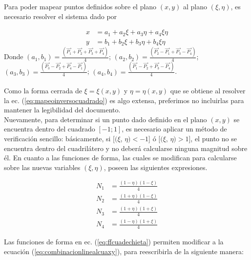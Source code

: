 Para poder mapear puntos definidos sobre el plano $(x,y)$ al plano $(\xi, \eta)$, es necesario resolver el sistema dado por 

\begin{equation}
  \label{eq:mapeoinversocuadrado}
  \begin{split}
    x & = a_1 + a_2\xi + a_3\eta + a_4\xi\eta \\
    y & = b_1 + b_2\xi + b_3\eta + b_4\xi\eta
  \end{split}
\end{equation}
Donde $(a_1, b_1)= \frac{(\vec{P_1} + \vec{P_2} + \vec{P_3} +
  \vec{P_4})}{4}$; $(a_2, b_2)=  \frac{(\vec{P_2} - \vec{P_1} + \vec{P_3} -
  \vec{P_4})}{4}$; $(a_3, b_3)= \frac{(\vec{P_3} - \vec{P_2} + \vec{P_4} -
  \vec{P_1})}{4} $; $(a_4, b_4)= \frac{(\vec{P_1} - \vec{P_2} + \vec{P_3} - \vec{P_4})}{4}$. \\ \\
Como la forma cerrada de $\xi= \xi(x,y)$ y $\eta= \eta(x,y)$ que se obtiene al resolver la ec. (\ref{eq:mapeoinversocuadrado}) es algo extensa, preferimos no incluirlas para mantener la legibilidad del documento. \\
Nuevamente, para determinar si un punto dado definido en el plano $(x,y)$ se encuentra dentro del cuadrado $[-1; 1]$, es necesario aplicar un método de verificación sencillo: básicamente, si [$(\xi$, $\eta) <  -1$] ó [$(\xi$, $\eta) >  1  $], el punto no se encuentra dentro del cuadrilátero y no deberá calcularse ninguna magnitud sobre él. En cuanto a las funciones de forma, las cuales se modifican para calcularse sobre las nuevas variables $(\xi, \eta)$, poseen las siguientes expresiones.

\begin{equation}
  \label{eq:ffcuadechieta}
  \begin{split}
    N_1 & = \frac{ (1-\eta)(1-\xi) }{4} \\
    N_2 & = \frac{ (1+\eta)(1-\xi) }{4} \\
    N_3 & = \frac{ (1+\eta)(1+\xi) }{4} \\
    N_4 & = \frac{ (1-\eta)(1+\xi) }{4} 
  \end{split}
\end{equation}

Las funciones de forma en ec. (\ref{eq:ffcuadechieta}) permiten modificar a la ecuación (\ref{eq:combinacionlinealcuaxy}), para reescribirla de la siguiente manera:

